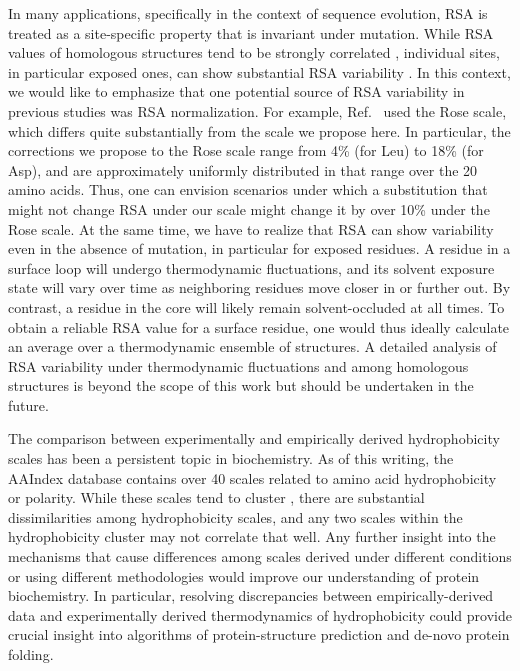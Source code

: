 \documentclass[11pt]{article}
\begin{document}
In many applications, specifically in the context of sequence evolution, RSA is treated as a site-specific property that is invariant under mutation. While RSA values of homologous structures tend to be strongly correlated \cite{RostSander1994,Zhouetal2009}, individual sites, in particular exposed ones, can show substantial RSA variability \cite{RostSander1994}. In this context, we would like to emphasize that one potential source of RSA variability in previous studies was RSA normalization. For example, Ref.~\cite{RostSander1994} used the Rose scale, which differs quite substantially from the scale we propose here. In particular, the corrections we propose to the Rose scale range from 4\% (for Leu) to 18\% (for Asp), and are approximately uniformly distributed in that range over the 20 amino acids. Thus, one can envision scenarios under which a substitution that might not change RSA under our scale might change it by over 10\% under the Rose scale.
At the same time, we have to realize that RSA can show variability even in the absence of mutation, in particular for exposed residues. A residue in a surface loop will undergo thermodynamic fluctuations, and its solvent exposure state will vary over time as neighboring residues move closer in or further out. By contrast, a residue in the core will likely remain solvent-occluded at all times. To obtain a reliable RSA value for a surface residue, one would thus ideally calculate an average over a thermodynamic ensemble of structures. A detailed analysis of RSA variability under thermodynamic fluctuations and among homologous structures is beyond the scope of this work but should be undertaken in the future.

The comparison between experimentally and empirically derived hydrophobicity scales has been a persistent topic in biochemistry. As of this writing, the AAIndex database \cite{KawashimaKanehisa2000} contains over 40 scales related to amino acid hydrophobicity or polarity. While these scales tend to cluster \cite{TomiiKanehisa1996,Kawashimaetal2008}, there are substantial dissimilarities among hydrophobicity scales, and any two scales within the hydrophobicity cluster may not correlate that well. Any further insight into the mechanisms that cause differences among scales derived under different conditions or using different methodologies would improve our understanding of protein biochemistry. In particular, resolving discrepancies between empirically-derived data and experimentally derived thermodynamics of hydrophobicity could provide crucial insight into algorithms of protein-structure prediction and de-novo protein folding. 
\end{document}
